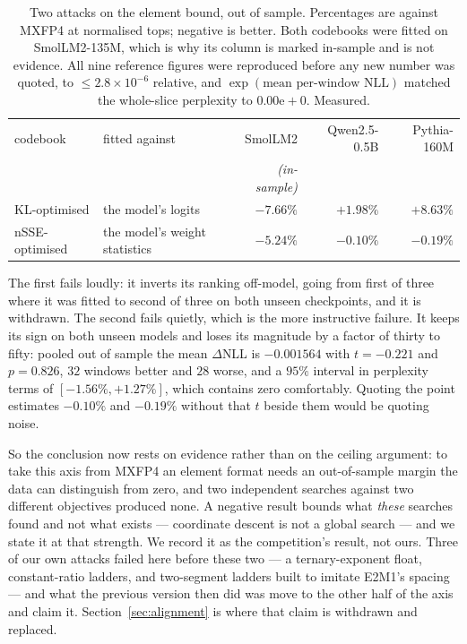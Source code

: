 \documentclass[11pt]{article}
\theoremstyle{definition}
\begin{document}
\begin{table}[t]\centering
\caption{Two attacks on the element bound, out of sample. Percentages are against
MXFP4 at normalised tops; negative is better. Both codebooks were fitted on
SmolLM2-135M, which is why its column is marked in-sample and is not evidence.
All nine reference figures were reproduced before any new number was quoted, to
$\leq 2.8\times10^{-6}$ relative, and $\exp(\text{mean per-window NLL})$ matched
the whole-slice perplexity to $0.00\mathrm{e}{+}0$. Measured.}
\label{tab:blockattacks}
\small\setlength{\tabcolsep}{5pt}
\begin{tabular}{llrrr}
\toprule
codebook & fitted against & SmolLM2 & Qwen2.5-0.5B & Pythia-160M \\
         &                & \emph{(in-sample)} & & \\
\midrule
KL-optimised   & the model's logits            & $-7.66\%$ & $+1.98\%$ & $+8.63\%$ \\
nSSE-optimised & the model's weight statistics & $-5.24\%$ & $-0.10\%$ & $-0.19\%$ \\
\bottomrule
\end{tabular}
\end{table}

The first fails loudly: it inverts its ranking off-model, going from first of
three where it was fitted to second of three on both unseen checkpoints, and it
is withdrawn. The second fails quietly, which is the more instructive failure. It
keeps its sign on both unseen models and loses its magnitude by a factor of
thirty to fifty: pooled out of sample the mean $\Delta$NLL is $-0.001564$ with
$t = -0.221$ and $p = 0.826$, $32$ windows better and $28$ worse, and a $95\%$
interval in perplexity terms of $[-1.56\%, +1.27\%]$, which contains zero
comfortably. Quoting the point estimates $-0.10\%$ and $-0.19\%$ without that
$t$ beside them would be quoting noise.

So the conclusion now rests on evidence rather than on the ceiling argument: to
take this axis from MXFP4 an element format needs an out-of-sample margin the
data can distinguish from zero, and two independent searches against two
different objectives produced none. A negative result bounds what \emph{these}
searches found and not what exists --- coordinate descent is not a global search
--- and we state it at that strength. We record it as the competition's result,
not ours. Three of our own attacks failed here before these two --- a
ternary-exponent float, constant-ratio ladders, and two-segment ladders built to
imitate E2M1's spacing --- and what the previous version then did was move to the
other half of the axis and claim it. Section~\ref{sec:alignment} is where that
claim is withdrawn and replaced.
\end{document}
